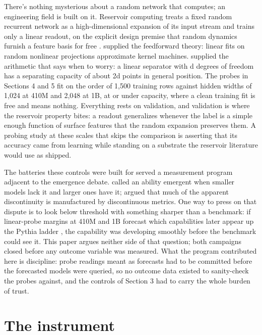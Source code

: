 There's nothing mysterious about a random network that computes; an
engineering field is built on it. Reservoir computing treats a fixed
random recurrent network as a high-dimensional expansion of its input
stream and trains only a linear readout, on the explicit design premise
that random dynamics furnish a feature basis for free \citep{jaeger2001echo,maass2002realtime}. \citet{rahimi2007random}
supplied the feedforward theory: linear fits on random nonlinear
projections approximate kernel machines. \citet{cover1965geometrical} supplied the
arithmetic that says when to worry: a linear separator with d degrees
of freedom has a separating capacity of about 2d points in general
position. The probes in Sections 4 and 5 fit on the order of 1,500
training rows against hidden widths of 1,024 at 410M and 2,048 at 1B,
at or under capacity, where a clean training fit is free and means
nothing. Everything rests on validation, and validation is where the
reservoir property bites: a readout generalizes whenever the label is a
simple enough function of surface features that the random expansion
preserves them. A probing study at these scales that skips the
comparison is asserting that its accuracy came from learning while
standing on a substrate the reservoir literature would use as shipped.

The batteries these controls were built for served a measurement
program adjacent to the emergence debate. \citet{wei2022emergent} called an
ability emergent when smaller models lack it and larger ones have it;
\citet*{schaeffer2023mirage} argued that much of the apparent
discontinuity is manufactured by discontinuous metrics. One way to
press on that dispute is to look below threshold with something sharper
than a benchmark: if linear-probe margins at 410M and 1B forecast which
capabilities later appear up the Pythia ladder \citep{biderman2023pythia},
the capability was developing smoothly before the benchmark could see
it. This paper argues neither side of that question; both campaigns
closed before any outcome variable was measured. What the program
contributed here is discipline: probe readings meant as forecasts had
to be committed before the forecasted models were queried, so no
outcome data existed to sanity-check the probes against, and the
controls of Section 3 had to carry the whole burden of trust.

\section{The instrument}\label{the-instrument}

